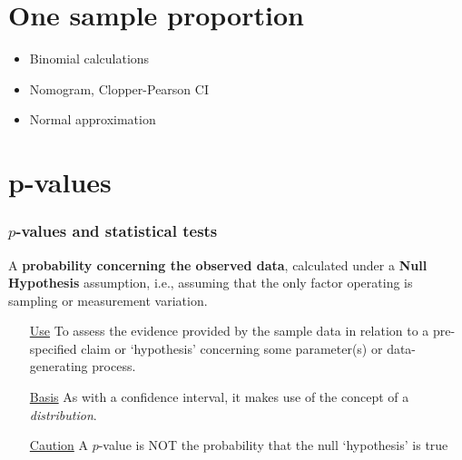 \documentclass[10pt,handout]{beamer}\usepackage[]{graphicx}\usepackage[]{color}
\begin{document}
\section{One sample proportion}

\begin{frame}
	\begin{itemize}
		\item Binomial calculations
		\item Nomogram, Clopper-Pearson CI
		\item Normal approximation
	\end{itemize}
\end{frame}


\section{p-values}

\begin{frame}
	\frametitle{$p$-values and statistical tests}
	
	
	\begin{defm}[$p$-value]
		A \textbf{probability concerning the observed data}, calculated under a \textbf{Null Hypothesis} assumption, i.e., assuming that the only factor operating is sampling or measurement variation. 
	\end{defm}
	
	\begin{itemize} 
		\item[\underline{Use}] To assess the evidence provided by the sample data
		in relation to a pre-specified claim or `hypothesis' concerning some parameter(s) or data-generating process. 
		\item[\underline{Basis}] As with a confidence interval, it makes use of the concept of a \textit{distribution}. 
		\item[\underline{Caution}] A $p$-value is NOT the probability that the null `hypothesis' is true
	\end{itemize}
\end{frame}
\end{document}
